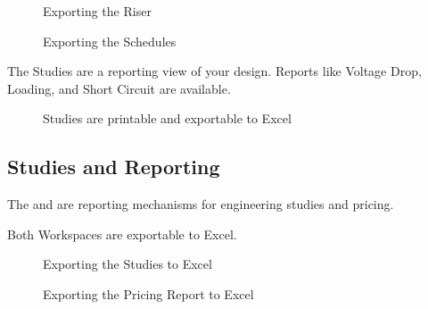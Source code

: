 \documentclass[letterpaper,10pt,english]{sphinxmanual}
\begin{document}
\begin{figure}[H]
\centering
\capstart

\noindent{}
\caption{Exporting the Riser}\label{\detokenize{docs/tutorial/index-tutorial:id25}}\end{figure}

\begin{figure}[H]
\centering
\capstart

\noindent{}
\caption{Exporting the Schedules}\label{\detokenize{docs/tutorial/index-tutorial:id26}}\end{figure}

The Studies are a reporting view of your design.  Reports like Voltage Drop, Loading, and Short Circuit are available.

\begin{figure}[H]
\centering
\capstart

\noindent{}
\caption{Studies are printable and exportable to Excel}\label{\detokenize{docs/tutorial/index-tutorial:id27}}\end{figure}


\subsection{Studies and Reporting}
\label{\detokenize{docs/tutorial/index-tutorial:studies-and-reporting}}
The {\hyperref[\detokenize{docs/userguide/buildingelectricalmodel/studies/index-studies:studies}]{}} and {\hyperref[\detokenize{docs/userguide/pricingmodel/pricingreport/index-pricing_report:pricing-report}]{}} are reporting mechanisms for engineering studies and pricing.

Both Workspaces are exportable to Excel.

\begin{figure}[H]
\centering
\capstart

\noindent{}
\caption{Exporting the Studies to Excel}\label{\detokenize{docs/tutorial/index-tutorial:id28}}\end{figure}

\begin{figure}[H]
\centering
\capstart

\noindent{}
\caption{Exporting the Pricing Report to Excel}\label{\detokenize{docs/tutorial/index-tutorial:id29}}\end{figure}
\end{document}
